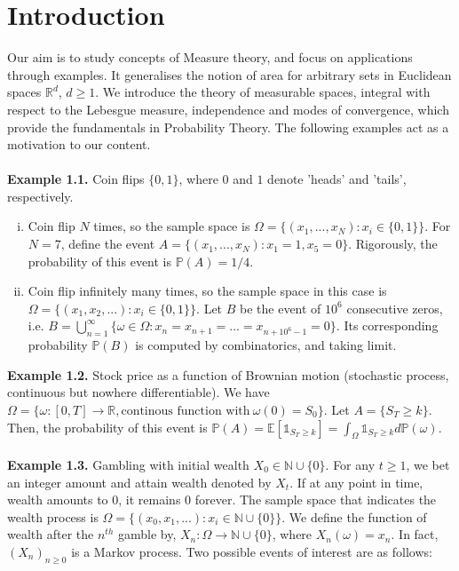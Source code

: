 \documentclass{article}
\begin{document}
\section{Introduction}
Our aim is to study concepts of Measure theory, and focus on applications through examples. It generalises the notion of area for arbitrary sets in Euclidean spaces $\mathbb{R}^d$, $d \geq 1$. We introduce the theory of measurable spaces, integral with respect to the Lebesgue measure, independence and modes of convergence, which provide the fundamentals in Probability Theory. The following examples act as a motivation to our content.\\\\
\textbf{Example 1.1.} Coin flips $\{0,1\}$, where $0$ and $1$ denote 'heads' and 'tails', respectively.
\begin{enumerate}[(i)]
	\item Coin flip $N$ times, so the sample space is $\Omega = \{(x_1, ..., x_N): x_i \in \{0,1\}\}$. For $N=7$, define the event $A = \{(x_1, ..., x_N): x_1 = 1, x_5 = 0\}$. Rigorously, the probability of this event is $\mathbb{P}(A) = 1/4$.
	\item Coin flip infinitely many times, so the sample space in this case is $\Omega = \{(x_1, x_2, ...): x_i \in \{0,1\}\}$. Let $B$ be the event of $10^6$ consecutive zeros, i.e. $B = \bigcup_{n=1}^{\infty}\{\omega \in \Omega: x_n = x_{n+1} = ... = x_{n+10^6-1} = 0\}$. Its corresponding probability $\mathbb{P}(B)$ is computed by combinatorics, and taking limit.
\end{enumerate}
\textbf{Example 1.2.} Stock price as a function of Brownian motion (stochastic process, continuous but nowhere differentiable). We have $\Omega = \{\omega: [0,T] \to \mathbb{R}, \text{continous function with} \ \omega(0) = S_0 \}$. Let $A = \{S_T \geq k\}$. Then, the probability of this event is $\mathbb{P}(A) = \mathbb{E}[\mathds{1}_{S_{T} \geq k}] = \int_{\Omega}\mathds{1}_{S_{T} \geq k}d\mathbb{P}(\omega)$.\\\\
\textbf{Example 1.3.} Gambling with initial wealth $X_0 \in \mathbb{N}\cup\{0\}$. For any $t \geq 1$, we bet an integer amount and attain wealth denoted by $X_t$. If at any point in time, wealth amounts to $0$, it remains $0$ forever. The sample space that indicates the wealth process is $\Omega = \{(x_0, x_1, ...): x_i \in \mathbb{N}\cup\{0\}\}$. We define the function of wealth after the $n^{th}$ gamble by, $X_n : \Omega \to \mathbb{N}\cup\{0\}$, where $X_n(\omega) = x_n$. In fact, $(X_n)_{n \geq 0}$ is a Markov process. Two possible events of interest are as follows:
\end{document}
